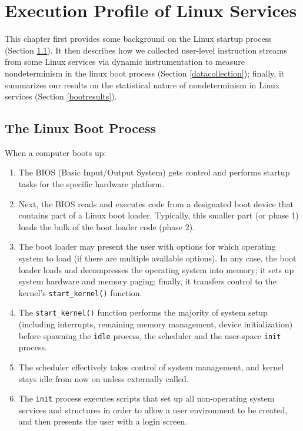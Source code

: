 \chapter{Execution Profile of Linux Services} \label{ch:boot}
This chapter first provides some background on the
Linux startup process (Section \ref{linuxboot}).  
It then describes how we collected user-level instruction
streams from some Linux services via dynamic instrumentation to 
measure nondeterminism in the linux boot process (Section \ref{datacollection});
finally, it summarizes our results on the statistical nature
of nondeterminism in Linux services (Section \ref{bootresults}).

\section{The Linux Boot Process}\label{linuxboot}
When a computer boots up:
\begin{enumerate}
\item The BIOS (Basic Input/Output System) 
gets control and performs startup tasks for the specific hardware platform.
\item Next, the BIOS reads and executes code from a designated boot device 
that contains part of a Linux boot loader. Typically,
this smaller part (or phase 1) 
loads the bulk of the boot loader code (phase 2).
\item The boot loader may present the user with options for 
which operating system to load (if there are multiple available options).
In any case, the boot loader loads and decompresses the operating system
into memory; it sets up system hardware and
memory paging; finally, it transfers control to the kernel's
\texttt{start\_kernel()} function.
\item The \texttt{start\_kernel()} function performs the 
majority of system setup (including interrupts, remaining memory
 management, device initialization)
before spawning the \texttt{idle} process, the scheduler
and the user-space \texttt{init} process.
\item The scheduler effectively takes control of system management,
and kernel stays idle from now on unless externally called.
\item The \texttt{init} process executes scripts that set up all
non-operating system services and structures in order to allow 
a user environment to be created, and then presents the user with a login screen.
\end{enumerate}

